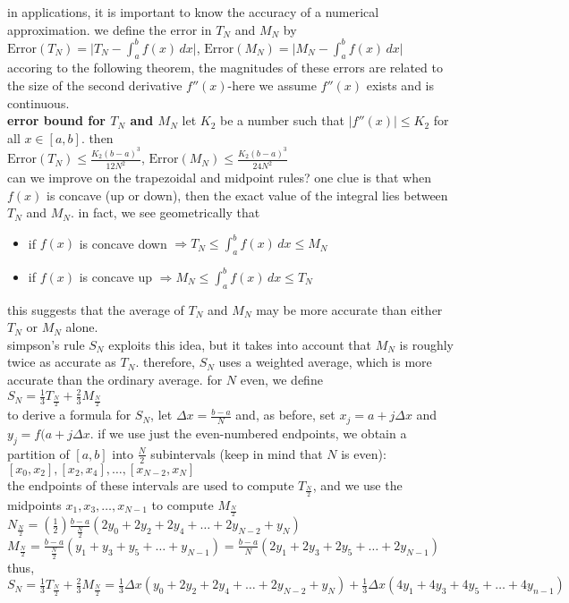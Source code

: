 \documentclass{article}
\begin{document}
in applications, it is important to know the accuracy of a numerical approximation. we define the error in $T_N$ and $M_N$ by\\
$\text{Error}(T_N) = \lvert T_N - \int_{a}^{b}f(x)\,dx\rvert$, $\text{Error}(M_N) = \lvert M_N - \int_{a}^{b}f(x)\,dx\rvert$\\
accoring to the following theorem, the magnitudes of these errors are related to the size of the second derivative $f''(x)$-here we assume $f''(x)$ exists and is continuous.\\

\textbf{error bound for $T_N$ and $M_N$} let $K_2$ be a number such that $\lvert f''(x)\rvert \leq K_2$ for all $x \in [a, b]$. then\\
$\text{Error}(T_N) \leq \frac{K_2(b-a)^3}{12N^2}$, $\text{Error}(M_N) \leq \frac{K_2(b - a)^3}{24N^2}$\\

can we improve on the trapezoidal and midpoint rules? one clue is that when $f(x)$ is concave (up or down), then the exact value of the integral lies between $T_N$ and $M_N$. in fact, we see geometrically that
	\begin{itemize}
		\item if $f(x)$ is concave down $\Rightarrow T_N \leq \int_{a}^{b}f(x)\,dx \leq M_N$
		\item if $f(x)$ is concave up $\Rightarrow M_N \leq \int_{a}^{b}f(x)\,dx \leq T_N$ 
	\end{itemize}
this suggests that the average of $T_N$ and $M_N$ may be more accurate than either $T_N$ or $M_N$ alone.\\ simpson's rule $S_N$ exploits this idea, but it takes into account that $M_N$ is roughly twice as accurate as $T_N$. therefore, $S_N$ uses a weighted average, which is more accurate than the ordinary average. for $N$ even, we define\\ $S_N = \frac{1}{3}T_{\frac{N}{2}} + \frac{2}{3}M_{\frac{N}{2}}$\\ to derive a formula for $S_N$, let $\Delta x = \frac{b - a}{N}$ and, as before, set $x_j = a + j\Delta x$ and $y_j = f(a + j\Delta x$. if we use just the even-numbered endpoints, we obtain a partition of $[a, b]$ into $\frac{N}{2}$ subintervals (keep in mind that $N$ is even):\\ $[x_0, x_2], [x_2, x_4], \ldots, [x_{N-2}, x_N]$\\ the endpoints of these intervals are used to compute $T_{\frac{N}{2}}$, and we use the midpoints $x_1, x_3, \ldots, x_{N-1}$ to compute $M_{\frac{N}{2}}$\\
$N_{\frac{N}{2}} = (\frac{1}{2})\frac{b - a}{\frac{N}{2}}(2y_0 + 2y_2 + 2y_4 + \ldots + 2y_{N-2} + y_N)$\\
$M_{\frac{N}{2}} = \frac{b - a}{\frac{N}{2}}(y_1 + y_3 + y_5 + \ldots + y_{N-1}) = \frac{b - a}{N}(2y_1 + 2y_3 + 2y_5 + \ldots + 2y_{N-1})$\\
thus,\\
$S_N = \frac{1}{3}T_{\frac{N}{2}} + \frac{2}{3}M_{\frac{N}{2}} = \frac{1}{3}\Delta x(y_0 + 2y_2 + 2y_4 + \ldots + 2y_{N-2} + y_N) + \frac{1}{3}\Delta x(4y_1 + 4y_3 + 4y_5 + \ldots + 4y_{n-1})$\\
\end{document}
